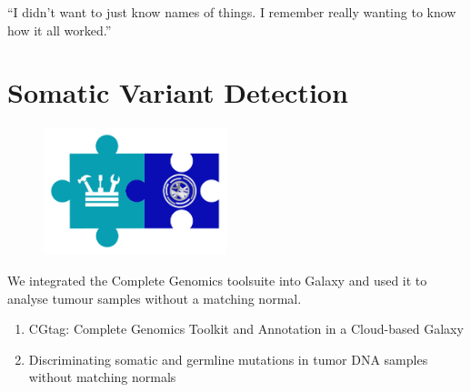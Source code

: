 \begin{savequote}[75mm]
“I didn’t want to just know names of things. I remember really wanting to know how it all worked.”
\end{savequote}

\chapter{Somatic Variant Detection}\label{chapter:virtualnormal}
\setcounter{figure}{-1}
\setcounter{table}{-1}
\setcounter{section}{-1}

\begin{figure}[t!]
\includegraphics[height=10em]{frontmatter/images/chapter-header-variants-tools.png}
\end{figure}
\setcounter{figure}{-1}
\setcounter{table}{-1}
\setcounter{section}{-1}

We integrated the Complete Genomics toolsuite into Galaxy and used it to analyse tumour samples without a matching normal.

\begin{enumerate}
\itemsep-0.5em
\item CGtag: Complete Genomics Toolkit and Annotation in a Cloud-based Galaxy
\item Discriminating somatic and germline mutations in tumor DNA samples without matching normals
\end{enumerate}
